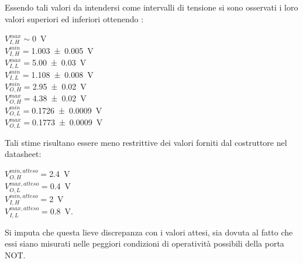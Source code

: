	 Essendo tali valori da intendersi come intervalli di tensione si sono osservati i loro valori superiori ed inferiori ottenendo :
	 \begin{center}
	 $V_{I,H}^{max}\sim$\SI{0}{\volt} \\
	 $V_{I,H}^{min}=$\SI{1.003 \pm 0.005}{\volt}\\
	 $V_{I,L}^{max}=$\SI{5.00 \pm 0.03}{\volt}\\
	 $V_{I,L}^{min}=$\SI{1.108 \pm 0.008}{\volt}\\
	 
	 $V_{O,H}^{min}=$\SI{2.95 \pm 0.02}{\volt}\\
	 $V_{O,H}^{max}=$\SI{4.38 \pm 0.02}{\volt}\\
	 $V_{O,L}^{min}=$\SI{0.1726 \pm 0.0009}{\volt}\\
	 $V_{O,L}^{max}=$\SI{0.1773 \pm 0.0009}{\volt}	\\
	 \end{center}
	 
	 Tali stime risultano essere meno restrittive dei  valori
	  forniti dal costruttore nel datasheet:
	   \begin{center}
	  	
	  	$V_{O,H}^{min,atteso}=$\SI{2.4}{\volt}\\
	  	$V_{O,L}^{max,atteso}=$\SI{0.4}{\volt}\\
	  	$V_{I,H}^{min,atteso}=$\SI{2}{\volt}\\
	  	$V_{I,L}^{max,atteso}=$\SI{0.8}{\volt}.\\
	  \end{center}
	  Si imputa che questa lieve discrepanza 
	 con i valori attesi, sia dovuta al fatto che essi siano misurati nelle peggiori condizioni di operatività possibili della porta NOT.
	
